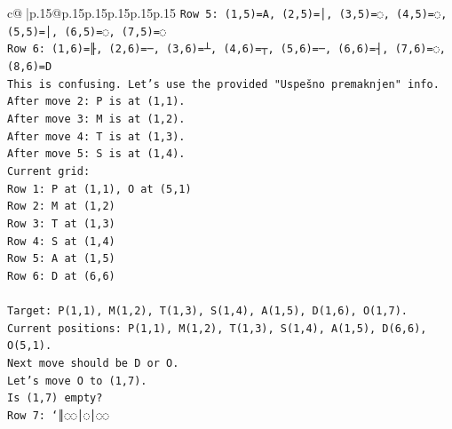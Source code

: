\documentclass{article}
\begin{document}
{\begin{supertabular}{c@{$\;$}|p{.15\linewidth}@{}p{.15\linewidth}p{.15\linewidth}p{.15\linewidth}p{.15\linewidth}p{.15\linewidth}}
{{{\texttt{Row 5: (1,5)=A, (2,5)=│, (3,5)=◌, (4,5)=◌, (5,5)=│, (6,5)=◌, (7,5)=◌} \\
\texttt{Row 6: (1,6)=╟, (2,6)=─, (3,6)=┴, (4,6)=┬, (5,6)=─, (6,6)=┤, (7,6)=◌, (8,6)=D} \\
\texttt{This is confusing. Let's use the provided "Uspešno premaknjen" info.} \\
\texttt{After move 2: P is at (1,1).} \\
\texttt{After move 3: M is at (1,2).} \\
\texttt{After move 4: T is at (1,3).} \\
\texttt{After move 5: S is at (1,4).} \\
\texttt{Current grid:} \\
\texttt{Row 1: P at (1,1), O at (5,1)} \\
\texttt{Row 2: M at (1,2)} \\
\texttt{Row 3: T at (1,3)} \\
\texttt{Row 4: S at (1,4)} \\
\texttt{Row 5: A at (1,5)} \\
\texttt{Row 6: D at (6,6)} \\
\\ 
\texttt{Target: P(1,1), M(1,2), T(1,3), S(1,4), A(1,5), D(1,6), O(1,7).} \\
\texttt{Current positions: P(1,1), M(1,2), T(1,3), S(1,4), A(1,5), D(6,6), O(5,1).} \\
\texttt{Next move should be D or O.} \\
\texttt{Let's move O to (1,7).} \\
\texttt{Is (1,7) empty?} \\
\texttt{Row 7: `║◌◌│◌│◌◌} \\
            }
        }
    }
     \\ \\


\end{supertabular}}
\end{document}
